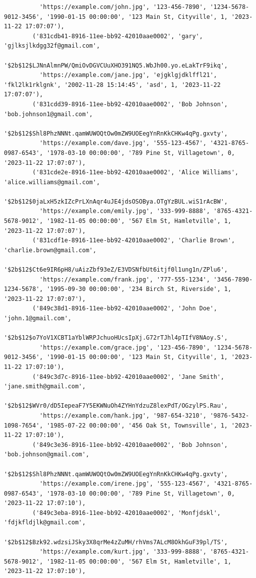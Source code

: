 \documentclass[a4paper, 12pt]{article}
\begin{document}
\begin{verbatim}
          'https://example.com/john.jpg', '123-456-7890', '1234-5678-9012-3456', '1990-01-15 00:00:00', '123 Main St, Cityville', 1, '2023-11-22 17:07:07'),
        ('831cdb41-8916-11ee-bb92-42010aae0002', 'gary', 'gjlksjlkdgg32f@gmail.com',
         '$2b$12$LJNnAlmnPW/QmiOvDGVCUuXHO391NQ5.WbJh00.yo.eLakTrF9ikq',
          'https://example.com/jane.jpg', 'ejgklgjdklffl21', 'fkl2lk1rklgnk', '2002-11-28 15:14:45', 'asd', 1, '2023-11-22 17:07:07'),
        ('831cdd39-8916-11ee-bb92-42010aae0002', 'Bob Johnson', 'bob.johnson1@gmail.com',
         '$2b$12$Shl8PhzNNNt.qamWUWOQtOw0mZW9UOEegYnRnKkCHKw4qPg.gxvty',
          'https://example.com/dave.jpg', '555-123-4567', '4321-8765-0987-6543', '1978-03-10 00:00:00', '789 Pine St, Villagetown', 0, '2023-11-22 17:07:07'),
        ('831cde2e-8916-11ee-bb92-42010aae0002', 'Alice Williams', 'alice.williams@gmail.com',
         '$2b$12$0jaLxH5zkIZcPrLXnAqr4uJE4jdsOSOBya.OTgYzBUL.wiS1rAcBW',
          'https://example.com/emily.jpg', '333-999-8888', '8765-4321-5678-9012', '1982-11-05 00:00:00', '567 Elm St, Hamletville', 1, '2023-11-22 17:07:07'),
        ('831cdf1e-8916-11ee-bb92-42010aae0002', 'Charlie Brown', 'charlie.brown@gmail.com',
         '$2b$12$Ct6e9IR6pH8/uAizZbf93eZ/E3VDSNfbUt6itjf0l1ung1n/ZPlu6',
          'https://example.com/frank.jpg', '777-555-1234', '3456-7890-1234-5678', '1995-09-30 00:00:00', '234 Birch St, Riverside', 1, '2023-11-22 17:07:07'),
        ('849c38d1-8916-11ee-bb92-42010aae0002', 'John Doe', 'john.1@gmail.com',
         '$2b$12$o7YoV1XCBT1aYblWRPJchuoHUcsIpXj.G72rTJhl4pTIfV8NAoy.S',
          'https://example.com/grace.jpg', '123-456-7890', '1234-5678-9012-3456', '1990-01-15 00:00:00', '123 Main St, Cityville', 1, '2023-11-22 17:07:10'),
        ('849c3d7c-8916-11ee-bb92-42010aae0002', 'Jane Smith', 'jane.smith@gmail.com',
         '$2b$12$WVr0/dD5IepeaF7Y5EKWNuOh4ZYHnYdzuZ8lexPdT/OGzylPS.Rau',
          'https://example.com/hank.jpg', '987-654-3210', '9876-5432-1098-7654', '1985-07-22 00:00:00', '456 Oak St, Townsville', 1, '2023-11-22 17:07:10'),
        ('849c3e36-8916-11ee-bb92-42010aae0002', 'Bob Johnson', 'bob.johnson@gmail.com',
         '$2b$12$Shl8PhzNNNt.qamWUWOQtOw0mZW9UOEegYnRnKkCHKw4qPg.gxvty',
          'https://example.com/irene.jpg', '555-123-4567', '4321-8765-0987-6543', '1978-03-10 00:00:00', '789 Pine St, Villagetown', 0, '2023-11-22 17:07:10'),
        ('849c3eba-8916-11ee-bb92-42010aae0002', 'Monfjdskl', 'fdjkfldjlk@gmail.com',
         '$2b$12$Bzk92.wdzsiJSky3X8qrMe4zZuMH/rhVms7ALcM8OkhGuF39pl/TS',
          'https://example.com/kurt.jpg', '333-999-8888', '8765-4321-5678-9012', '1982-11-05 00:00:00', '567 Elm St, Hamletville', 1, '2023-11-22 17:07:10'),

\end{verbatim}
\end{document}
